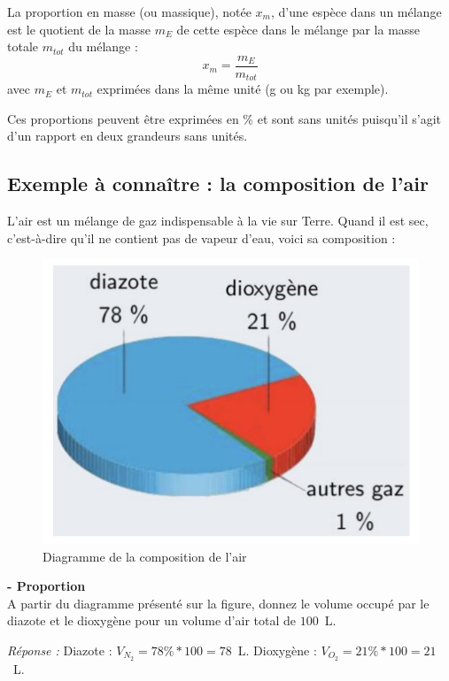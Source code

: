 \begin{tcolorbox}[colback=green!5!white,colframe=green!75!black,title=\textbf{Proportion massique}]
La proportion en masse (ou massique), notée $x_m$, d'une espèce dans un mélange est le quotient de la masse $m_{E}$ de cette espèce dans le mélange par la masse totale $m_{tot}$ du mélange :
\begin{equation*}
    x_m=\frac{m_E}{m_{tot}}
\end{equation*}
avec $m_{E}$ et $m_{tot}$ exprimées dans la même unité (g ou kg par exemple).
\end{tcolorbox}

Ces proportions peuvent être exprimées en \% et sont sans unités puisqu'il s'agit d'un rapport en deux grandeurs sans unités.

\subsection{Exemple à connaître : la composition de l'air}
L'air est un mélange de gaz indispensable à la vie sur Terre. Quand il est sec, c'est-à-dire qu'il ne contient pas de vapeur d'eau, voici sa composition :
\begin{figure}[!hbt]
    \centering
    \includegraphics[scale=0.5]{Images/Chapitre_1/Composition_air.png}
    \caption{Diagramme de la composition de l'air}
    \label{fig:compo_air}
\end{figure}

\begin{mdframed}[style=autreexo]
\textbf{ - Proportion}\\
A partir du diagramme présenté sur la figure, donnez le volume occupé par le diazote et le dioxygène pour un volume d'air total de $100$~L.
\end{mdframed}
\textit{Réponse :} Diazote : $V_{N_2}=78\%*100=78$~L. Dioxygène : $V_{O_2}=21\%*100=21$~L.


